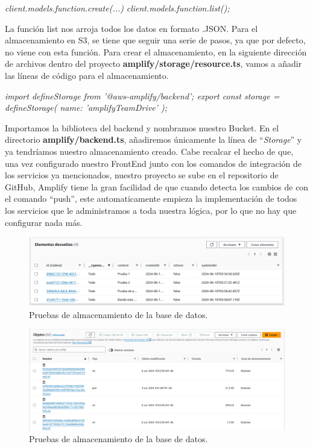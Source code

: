 \textit{client.models.function.create({...})}
\textit{client.models.function.list();}

La función list nos arroja todos los datos en formato .JSON.
Para el almacenamiento en S3, se tiene que seguir una serie de pasos, ya que por defecto, no viene con esta función. Para crear el almacenamiento, en la siguiente dirección de archivos dentro del proyecto \textbf{amplify/storage/resource.ts}, vamos a añadir las líneas de código para el almacenamiento.

\textit{import { defineStorage } from '@aws-amplify/backend';
export const storage = defineStorage({
	name: 'amplifyTeamDrive'
});}

Importamos la biblioteca del backend y nombramos nuestro Bucket. En el directorio\textbf{ amplify/backend.ts}, añadiremos únicamente la línea de “\textit{Storage}” y ya tendríamos nuestro almacenamiento creado.
Cabe recalcar el hecho de que, una vez configurado nuestro FrontEnd junto con los comandos de integración de los servicios ya mencionados, nuestro proyecto se sube en el repositorio de GitHub, Amplify tiene la gran facilidad de que cuando detecta los cambios de con el comando “push”, este automaticamente empieza la implementación de todos los servicios que le administramos a toda nuestra lógica, por lo que no hay que configurar nada más.

\begin{figure}[H]
	\centering
	\includegraphics[width=\linewidth]{imagenes/test1}
	\caption{Pruebas de almacenamiento de la base de datos.}
	\label{fig:test1}
\end{figure}

\begin{figure}[H]
	\centering
	\includegraphics[width=\linewidth]{imagenes/test2}
	\caption{Pruebas de almacenamiento de la base de datos.}
	\label{fig:test1}
\end{figure}


